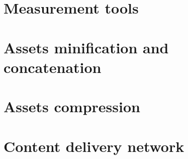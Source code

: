 \section{Measurement tools}

\section{Assets minification and concatenation}

\section{Assets compression}

\section{Content delivery network}
